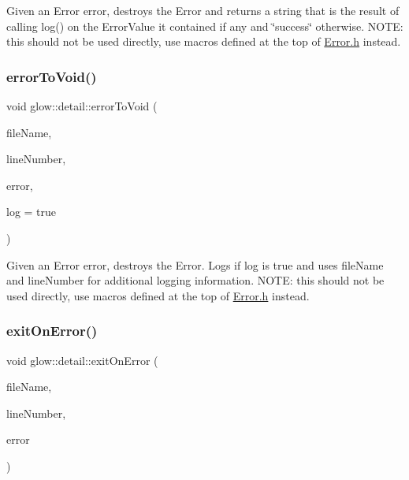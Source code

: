 Given an Error {\ttfamily error}, destroys the Error and returns a string that is the result of calling log() on the Error\+Value it contained if any and \char`\"{}success\char`\"{} otherwise. N\+O\+TE\+: this should not be used directly, use macros defined at the top of \hyperlink{_error_8h_source}{Error.\+h} instead. \mbox{\label{namespaceglow_1_1detail_a20b523c2b82a75da01d030784732a461}} 
\subsubsection{\texorpdfstring{error\+To\+Void()}{errorToVoid()}}
{\footnotesize\ttfamily void glow\+::detail\+::error\+To\+Void (\begin{DoxyParamCaption}\item[{const char $\ast$}]{file\+Name,  }\item[{size\+\_\+t}]{line\+Number,  }\item[{\hyperlink{classglow_1_1detail_1_1_glow_error}{Glow\+Error}}]{error,  }\item[{bool}]{log = {\ttfamily true} }\end{DoxyParamCaption})}

Given an Error {\ttfamily error}, destroys the Error. Logs if {\ttfamily log} is true and uses {\ttfamily file\+Name} and {\ttfamily line\+Number} for additional logging information. N\+O\+TE\+: this should not be used directly, use macros defined at the top of \hyperlink{_error_8h_source}{Error.\+h} instead. \mbox{\label{namespaceglow_1_1detail_ab97940326641f5f16ece0eb0013348e6}} 
\subsubsection{\texorpdfstring{exit\+On\+Error()}{exitOnError()}\hspace{0.1cm}{\footnotesize\ttfamily [1/2]}}
{\footnotesize\ttfamily void glow\+::detail\+::exit\+On\+Error (\begin{DoxyParamCaption}\item[{const char $\ast$}]{file\+Name,  }\item[{size\+\_\+t}]{line\+Number,  }\item[{\hyperlink{classglow_1_1detail_1_1_glow_error}{Glow\+Error}}]{error }\end{DoxyParamCaption})}

